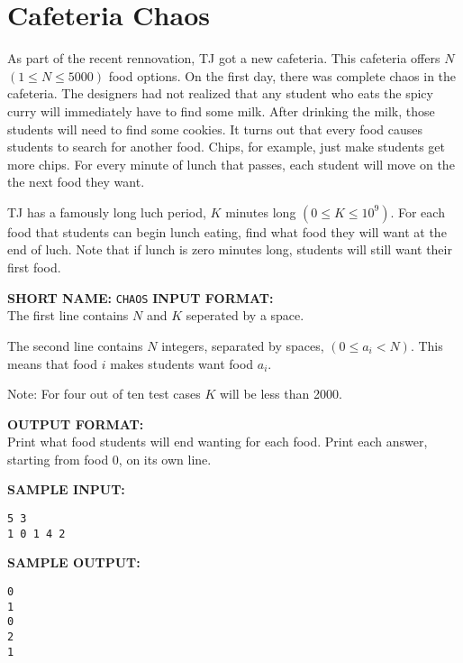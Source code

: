 \documentclass[twoside]{article}
\newcommand{\blank}{\vskip 3mm}
\begin{document}



\section{Cafeteria Chaos}

As part of the recent rennovation, TJ got a new cafeteria.  This cafeteria offers $N$ $(1\leq N \leq 5000)$ food options.  On the first day, there was complete chaos in the cafeteria.  The designers had not realized that any student who eats the spicy curry will immediately have to find some milk.  After drinking the milk, those students will need to find some cookies.  It turns out that every food causes students to search for another food.  Chips, for example, just make students get more chips.  For every minute of lunch that passes, each student will move on the the next food they want.

\blank
TJ has a famously long luch period, $K$ minutes long $(0\leq K \leq 10^9)$.  For each food that students can begin lunch eating, find what food they will want at the end of luch.  Note that if lunch is zero minutes long, students will still want their first food.


\textbf{SHORT NAME:} \verb|CHAOS|
\blank
\textbf{INPUT FORMAT:}\\
The first line contains $N$ and $K$ seperated by a space.

The second line contains $N$ integers, separated by spaces, $(0\leq a_i < N)$.  This means that food $i$ makes students want food $a_i$.

Note: For four out of ten test cases $K$ will be less than 2000.

\blank
\textbf{OUTPUT FORMAT:}\\

Print what food students will end wanting for each food.  Print each answer, starting from food 0, on its own line.

\blank
\textbf{SAMPLE INPUT:}
\begin{verbatim}
5 3
1 0 1 4 2
\end{verbatim}


\textbf{SAMPLE OUTPUT:}
\begin{verbatim}
0
1
0
2
1
\end{verbatim}
\end{document}
